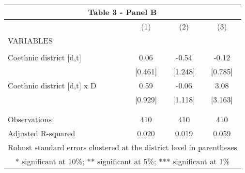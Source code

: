 \begin{tabular}{lccc}
\multicolumn{4}{c}{Table 3 - Panel B} \\ \hline
 & (1) & (2) & (3) \\
VARIABLES &  &  &  \\ \hline
 &  &  &  \\
Coethnic district [d,t] & 0.06 & -0.54 & -0.12 \\
 & [0.461] & [1.248] & [0.785] \\
Coethnic district [d,t] x D & 0.59 & -0.06 & 3.08 \\
 & [0.929] & [1.118] & [3.163] \\
 &  &  &  \\
 &  &  &  \\
Observations & 410 & 410 & 410 \\
 Adjusted R-squared & 0.020 & 0.019 & 0.059 \\ \hline
\multicolumn{4}{c}{ Robust standard errors clustered at the district level in parentheses} \\
\multicolumn{4}{c}{ * significant at 10\%; ** significant at 5\%; *** significant at 1\%} \\
\end{tabular}
